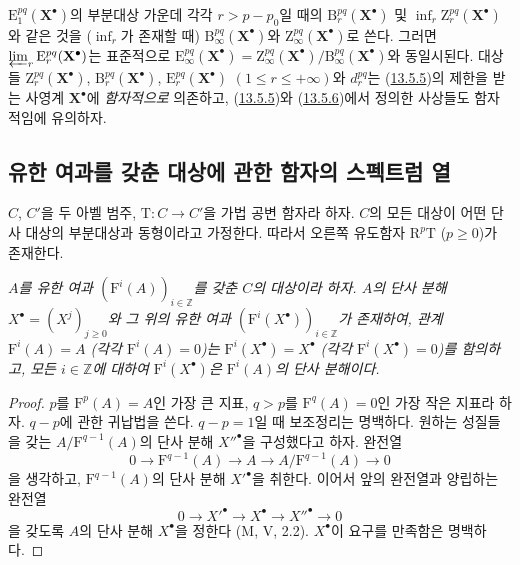 \begin{env}[13.5.7]
\label{0.13.5.7-fr}
$\mathrm E_1^{pq}(\mathbf X^\bullet)$의 부분대상 가운데 각각
$r>p-p_0$일 때의 $\mathrm B_r^{pq}(\mathbf X^\bullet)$ 및
$\inf_r\mathrm Z_r^{pq}(\mathbf X^\bullet)$와 같은 것을
($\inf_r$가 존재할 때)
$\mathrm B_\infty^{pq}(\mathbf X^\bullet)$와
$\mathrm Z_\infty^{pq}(\mathbf X^\bullet)$로 쓴다. 그러면
$\varprojlim_r\mathrm E_r^{pq}(\mathbf X^\bullet)$는 표준적으로
$\mathrm E_\infty^{pq}(\mathbf X^\bullet)=
\mathrm Z_\infty^{pq}(\mathbf X^\bullet)/
\mathrm B_\infty^{pq}(\mathbf X^\bullet)$와 동일시된다. 대상들
$\mathrm Z_r^{pq}(\mathbf X^\bullet)$,
$\mathrm B_r^{pq}(\mathbf X^\bullet)$,
$\mathrm E_r^{pq}(\mathbf X^\bullet)$ $(1\leq r\leq+\infty)$와
$d_r^{pq}$는 (\hyperref[0.13.5.5-fr]{13.5.5})의 제한을 받는 사영계
$\mathbf X^\bullet$에 \emph{함자적으로} 의존하고,
(\hyperref[0.13.5.5-fr]{13.5.5})와
(\hyperref[0.13.5.6-fr]{13.5.6})에서 정의한 사상들도 함자적임에
유의하자.
\end{env}

\subsection{유한 여과를 갖춘 대상에 관한 함자의 스펙트럼 열}
\label{subsection:0.13.6-fr}

\begin{env}[13.6.1]
\label{0.13.6.1-fr}
$C$, $C'$을 두 아벨 범주, $\mathrm T:C\to C'$을 가법 공변 함자라
하자. $C$의 모든 대상이 어떤 단사 대상의 부분대상과 동형이라고
가정한다. 따라서 오른쪽 유도함자 $\mathrm R^p\mathrm T$ ($p\geq0$)가
존재한다.
\end{env}

\begin{lemma}[13.6.2]
\label{0.13.6.2-fr}
\emph{$A$를 유한 여과 $(\mathrm F^i(A))_{i\in\mathbb Z}$를 갖춘
$C$의 대상이라 하자. $A$의 단사 분해
$X^\bullet=(X^j)_{j\geq0}$와 그 위의 유한 여과
$(\mathrm F^i(X^\bullet))_{i\in\mathbb Z}$가 존재하여, 관계
$\mathrm F^i(A)=A$ (각각 $\mathrm F^i(A)=0$)는
$\mathrm F^i(X^\bullet)=X^\bullet$ (각각
$\mathrm F^i(X^\bullet)=0$)를 함의하고, 모든 $i\in\mathbb Z$에
대하여 $\mathrm F^i(X^\bullet)$은 $\mathrm F^i(A)$의 단사 분해이다.}
\end{lemma}
\begin{proof}
$p$를 $\mathrm F^p(A)=A$인 가장 큰 지표, $q>p$를
$\mathrm F^q(A)=0$인 가장 작은 지표라 하자. $q-p$에 관한 귀납법을
쓴다. $q-p=1$일 때 보조정리는 명백하다. 원하는 성질들을 갖는
$A/\mathrm F^{q-1}(A)$의 단사 분해 ${X''}^\bullet$을 구성했다고 하자.
완전열
\[
0\to\mathrm F^{q-1}(A)\to A\to A/\mathrm F^{q-1}(A)\to0
\]
을 생각하고, $\mathrm F^{q-1}(A)$의 단사 분해 ${X'}^\bullet$을
취한다. 이어서 앞의 완전열과 양립하는 완전열
\[
0\to {X'}^\bullet\to X^\bullet\to {X''}^\bullet\to0
\]
을 갖도록 $A$의 단사 분해 $X^\bullet$을 정한다 (M, V, 2.2).
$X^\bullet$이 요구를 만족함은 명백하다.
\end{proof}

